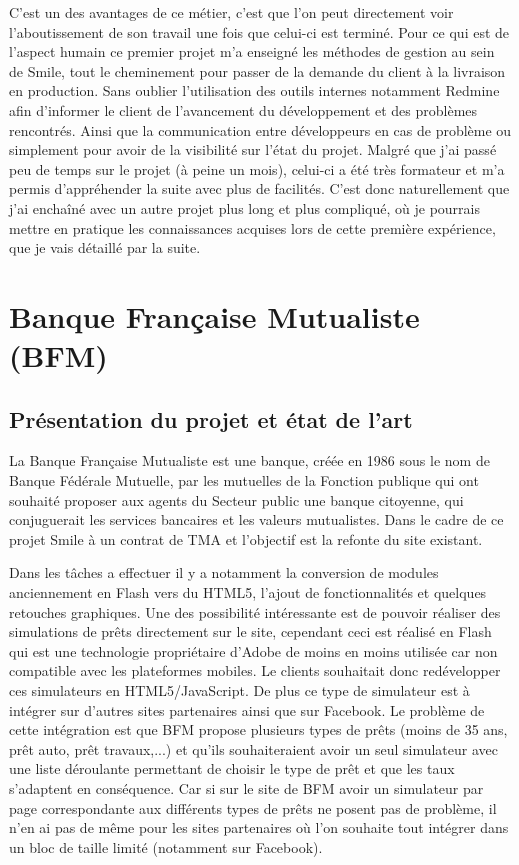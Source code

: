 \documentclass[a4paper,11pt,twoside]{report}
\begin{document}
    C'est un des avantages de ce métier, c'est que l'on peut directement voir l'aboutissement de son travail une fois que celui-ci est terminé. Pour ce qui est de l'aspect humain ce premier projet m'a enseigné les méthodes de gestion au sein de Smile, tout le cheminement pour passer de la demande du client à la livraison en production. Sans oublier l'utilisation des outils internes notamment Redmine afin d'informer le client de l'avancement du développement et des problèmes rencontrés. Ainsi que la communication entre développeurs en cas de problème ou simplement pour avoir de la visibilité sur l'état du projet. Malgré que j'ai passé peu de temps sur le projet (à peine un mois), celui-ci a été très formateur et m'a permis d'appréhender la suite avec plus de facilités. C'est donc naturellement que j'ai enchaîné avec un autre projet plus long et plus compliqué, où je pourrais mettre en pratique les connaissances acquises lors de cette première expérience, que je vais détaillé par la suite.  
    
\newpage
    
  \section{Banque Française Mutualiste (BFM)}
    \subsection*{Présentation du projet et état de l'art}
    La Banque Française Mutualiste est une banque, créée en 1986 sous le nom de Banque Fédérale Mutuelle, par les mutuelles de la Fonction publique qui ont souhaité proposer aux agents du Secteur public une banque citoyenne, qui conjuguerait les services bancaires et les valeurs mutualistes. Dans le cadre de ce projet Smile à un contrat de TMA et l'objectif est la refonte du site existant. 
    
    Dans les tâches a effectuer il y a notamment la conversion de modules anciennement en Flash vers du HTML5, l'ajout de fonctionnalités et quelques retouches graphiques. Une des possibilité intéressante est de pouvoir réaliser des simulations de prêts directement sur le site, cependant ceci est réalisé en Flash qui est une technologie propriétaire d'Adobe de moins en moins utilisée car non compatible avec les plateformes mobiles. Le clients souhaitait donc redévelopper ces simulateurs en HTML5/JavaScript. De plus ce type de simulateur est à intégrer sur d'autres sites partenaires ainsi que sur Facebook. Le problème de cette intégration est que BFM propose plusieurs types de prêts (moins de 35 ans, prêt auto, prêt travaux,...) et qu'ils souhaiteraient avoir un seul simulateur avec une liste déroulante permettant de choisir le type de prêt et que les taux s'adaptent en conséquence. Car si sur le site de BFM avoir un simulateur par page correspondante aux différents types de prêts ne posent pas de problème, il n'en ai pas de même pour les sites partenaires où l'on souhaite tout intégrer dans un bloc de taille limité (notamment sur Facebook). 
    
\end{document}
